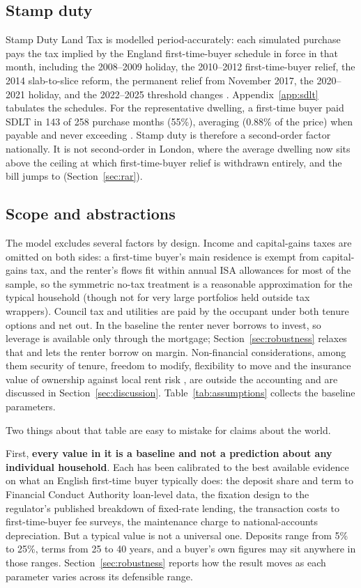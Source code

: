 \subsection{Stamp duty}

Stamp Duty Land Tax is modelled period-accurately: each simulated purchase pays the tax implied by the England first-time-buyer schedule in force in that month, including the 2008--2009 holiday, the 2010--2012 first-time-buyer relief, the 2014 slab-to-slice reform, the permanent relief from November 2017, the 2020--2021 holiday, and the 2022--2025 threshold changes \parencite{govuk_sdlt,hoc_sdlt}. Appendix~\ref{app:sdlt} tabulates the schedules. For the representative dwelling, a first-time buyer paid SDLT in 143 of 258 purchase months (55\%), averaging  (0.88\% of the price) when payable and never exceeding . Stamp duty is therefore a second-order factor nationally. It is not second-order in London, where the average dwelling now sits above the  ceiling at which first-time-buyer relief is withdrawn entirely, and the bill jumps to  (Section~\ref{sec:rar}).

\subsection{Scope and abstractions}

The model excludes several factors by design. Income and capital-gains taxes are omitted on both sides: a first-time buyer's main residence is exempt from capital-gains tax, and the renter's flows fit within annual ISA allowances for most of the sample, so the symmetric no-tax treatment is a reasonable approximation for the typical household (though not for very large portfolios held outside tax wrappers). Council tax and utilities are paid by the occupant under both tenure options and net out. In the baseline the renter never borrows to invest, so leverage is available only through the mortgage; Section~\ref{sec:robustness} relaxes that and lets the renter borrow on margin. Non-financial considerations, among them security of tenure, freedom to modify, flexibility to move and the insurance value of ownership against local rent risk \parencite{sinai2005}, are outside the accounting and are discussed in Section~\ref{sec:discussion}. Table~\ref{tab:assumptions} collects the baseline parameters.

Two things about that table are easy to mistake for claims about the world.

First, \textbf{every value in it is a baseline and not a prediction about any individual household}. Each has been calibrated to the best available evidence on what an English first-time buyer typically does: the deposit share and term to Financial Conduct Authority loan-level data, the fixation design to the regulator's published breakdown of fixed-rate lending, the transaction costs to first-time-buyer fee surveys, the maintenance charge to national-accounts depreciation. But a typical value is not a universal one. Deposits range from 5\% to 25\%, terms from 25 to 40 years, and a buyer's own figures may sit anywhere in those ranges. Section~\ref{sec:robustness} reports how the result moves as each parameter varies across its defensible range.


